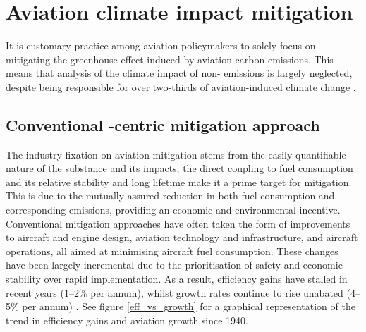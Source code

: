 \section{Aviation climate impact mitigation}
\label{Mitigation}
It is customary practice among aviation policymakers to solely focus on mitigating the greenhouse effect induced by aviation carbon emissions. This means that analysis of the climate impact of non- emissions is largely neglected, despite being responsible for over two-thirds of aviation-induced climate change \cite{Lee2021}. 

\subsection{Conventional -centric mitigation approach}
The industry fixation on aviation  mitigation stems from the easily quantifiable nature of the substance and its impacts; the direct coupling to fuel consumption and its relative stability and long lifetime make it a prime target for mitigation. This is due to the mutually assured reduction in both fuel consumption and corresponding  emissions, providing an economic and environmental incentive. Conventional mitigation approaches have often taken the form of improvements to aircraft and engine design, aviation technology and infrastructure, and aircraft operations, all aimed at minimising aircraft fuel consumption. These changes have been largely incremental due to the prioritisation of safety and economic stability over rapid implementation. As a result, efficiency gains have stalled in recent years (1--2\% per annum), whilst growth rates continue to rise unabated (4--5\% per annum) \cite{Peeters2016, Lee2021}. See figure \ref{eff_vs_growth} for a graphical representation of the trend in efficiency gains and aviation growth since 1940.

